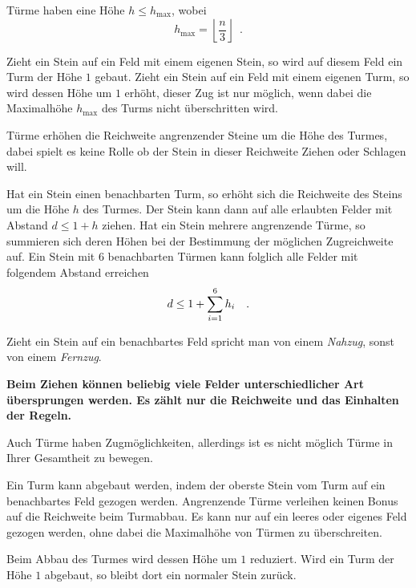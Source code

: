 Türme haben eine Höhe $h \le h_\text{max}$, wobei \[h_\text{max} = \left\lfloor \frac{n}{3}\right\rfloor\enspace .\]

Zieht ein Stein auf ein Feld mit einem eigenen Stein, so wird auf diesem Feld ein Turm der Höhe $1$ gebaut.
Zieht ein Stein auf ein Feld mit einem eigenen Turm, so wird dessen Höhe um $1$ erhöht, dieser Zug ist nur möglich, wenn dabei die Maximalhöhe $h_\text{max}$ des Turms nicht überschritten wird.

\bigskip

Türme erhöhen die Reichweite angrenzender Steine um die Höhe des Turmes, dabei spielt es keine Rolle ob der Stein in dieser Reichweite Ziehen oder Schlagen will.

Hat ein Stein einen benachbarten Turm, so erhöht sich die Reichweite des Steins um die Höhe $h$ des Turmes. Der Stein kann dann auf alle erlaubten Felder mit Abstand $d \le 1 + h$ ziehen. Hat ein Stein mehrere angrenzende Türme, so summieren sich deren Höhen bei der Bestimmung der möglichen Zugreichweite auf. Ein Stein mit $6$ benachbarten Türmen kann folglich alle Felder mit folgendem Abstand erreichen \[d \le 1 + \sum_{i=1}^6 h_i\hspace*{10pt}.\]

Zieht ein Stein auf ein benachbartes Feld spricht man von einem \emph{Nahzug}, sonst von einem \emph{Fernzug}.

\newpage
{}

\bigskip

\textbf{Beim Ziehen können beliebig viele Felder unterschiedlicher Art übersprungen werden. Es zählt nur die Reichweite und das Einhalten der Regeln.} \marginpar{\textbf{|}}

Auch Türme haben Zugmöglichkeiten, allerdings ist es nicht möglich Türme in Ihrer Gesamtheit zu bewegen. 

Ein Turm kann abgebaut werden, indem der oberste Stein vom Turm auf ein benachbartes Feld gezogen werden. Angrenzende Türme verleihen keinen Bonus auf die Reichweite beim Turmabbau. Es kann nur auf ein leeres oder eigenes Feld gezogen werden, ohne dabei die Maximalhöhe von Türmen zu überschreiten.

Beim Abbau des Turmes wird dessen Höhe um $1$ reduziert. Wird ein Turm der Höhe $1$ abgebaut, so bleibt dort ein normaler Stein zurück.

